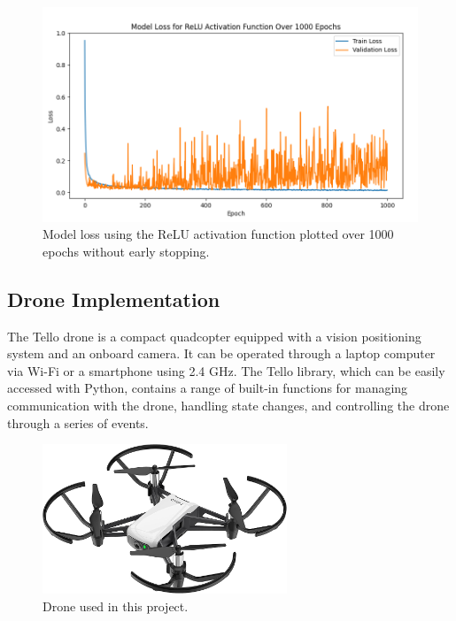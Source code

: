 \begin{figure}[ht!]
	\centering
	\includegraphics[width=\textwidth]{images/model_loss_over_1000_epochs.png}
	\caption{Model loss using the ReLU activation function plotted over 1000 epochs without early stopping.}
	\label{fig:epochs}
\end{figure}



\subsection{Drone Implementation}

The Tello drone is a compact quadcopter equipped with a vision positioning system and an onboard camera. It can be operated through a laptop computer via Wi-Fi or a smartphone using 2.4 GHz. The Tello library, which can be easily accessed with Python, contains a range of built-in functions for managing communication with the drone, handling state changes, and controlling the drone through a series of events.

\begin{figure}[h!]
	\centering
	\includegraphics[width = 0.65\textwidth]{images/drone.jpg}
	\caption{Drone used in this project.}
	\label{fig:tello}
\end{figure}


